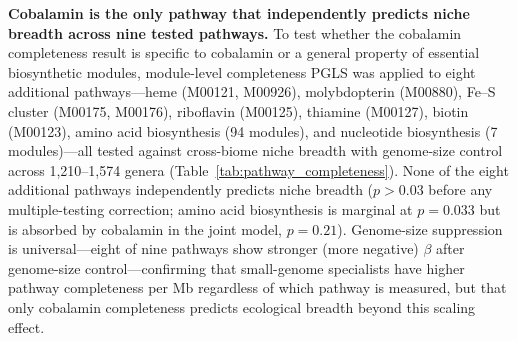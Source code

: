 \documentclass[times]{zHenriquesLab-StyleBioRxiv}
\begin{document}
\textbf{Cobalamin is the only pathway that independently predicts niche
breadth across nine tested pathways.} To test whether the cobalamin
completeness result is specific to cobalamin or a general property of essential
biosynthetic modules, module-level completeness PGLS was applied to eight
additional pathways---heme (M00121, M00926), molybdopterin (M00880), Fe--S
cluster (M00175, M00176), riboflavin (M00125), thiamine (M00127), biotin
(M00123), amino acid biosynthesis (94 modules), and nucleotide biosynthesis
(7 modules)---all tested against cross-biome niche breadth with genome-size
control across 1,210--1,574 genera (Table~\ref{tab:pathway_completeness}).
None of the eight additional pathways independently predicts niche breadth
($p > 0.03$ before any multiple-testing correction; amino acid biosynthesis is
marginal at $p = 0.033$ but is absorbed by cobalamin in the joint model,
$p = 0.21$). Genome-size suppression is universal---eight of nine pathways show
stronger (more negative) $\beta$ after genome-size control---confirming that
small-genome specialists have higher pathway completeness per Mb regardless of
which pathway is measured, but that only cobalamin completeness predicts
ecological breadth beyond this scaling effect.
\end{document}
